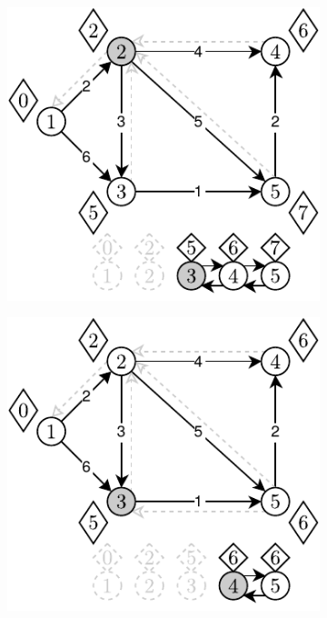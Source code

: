 \begin{figure}[!h]
\begin{subfigure}[b]{0.3\textwidth}
		\caption{}
	\end{subfigure}
	\begin{subfigure}[b]{0.3\textwidth}
		\includegraphics[width=\textwidth]{Chapter_II/DIJKSTRA-DLList/c.pdf}
		\caption{}
	\end{subfigure}
	\begin{subfigure}[b]{0.3\textwidth}
		\includegraphics[width=\textwidth]{Chapter_II/DIJKSTRA-DLList/d.pdf}

\end{subfigure}
\end{figure}
